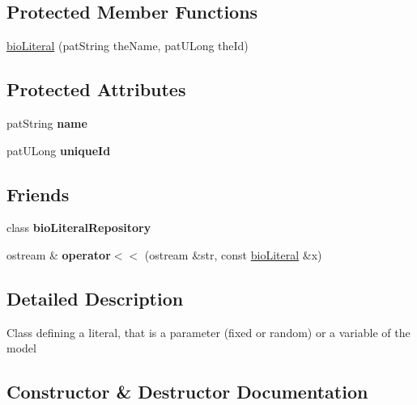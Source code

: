 \subsection*{Protected Member Functions}
\begin{DoxyCompactItemize}
\item 
\hyperlink{classbio_literal_a0dafb24f986651a33a06aae3d348f895}{bio\+Literal} (pat\+String the\+Name, pat\+U\+Long the\+Id)
\end{DoxyCompactItemize}
\subsection*{Protected Attributes}
\begin{DoxyCompactItemize}
\item 
\mbox{\label{classbio_literal_a6adc60747d813b36c8e4fe04b658ef9c}} 
pat\+String {\bfseries name}
\item 
\mbox{\label{classbio_literal_a98b45d6137ef95862ab4cf953f9f756c}} 
pat\+U\+Long {\bfseries unique\+Id}
\end{DoxyCompactItemize}
\subsection*{Friends}
\begin{DoxyCompactItemize}
\item 
\mbox{\label{classbio_literal_a6ea664ca897010b84852832942ab0274}} 
class {\bfseries bio\+Literal\+Repository}
\item 
\mbox{\label{classbio_literal_af99a3b7e4984c1be48e3658c27b8eac2}} 
ostream \& {\bfseries operator$<$$<$} (ostream \&str, const \hyperlink{classbio_literal}{bio\+Literal} \&x)
\end{DoxyCompactItemize}


\subsection{Detailed Description}
Class defining a literal, that is a parameter (fixed or random) or a variable of the model 

\subsection{Constructor \& Destructor Documentation}
\mbox{\label{classbio_literal_a0dafb24f986651a33a06aae3d348f895}} 
